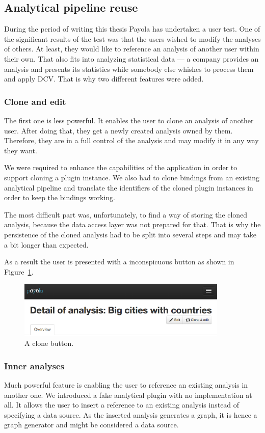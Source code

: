 \subsection{Analytical pipeline reuse}
During the period of writing this thesis Payola has undertaken a user test. One 
of the significant results of the test was that the users wished to modify the
analyses of others. At least, they would like to reference an analysis of 
another user within their own. That also fits into analyzing statistical data --- 
a company provides an analysis and presents its statistics while somebody else 
whishes to process them and apply DCV. That is why two different features 
were added.

\subsubsection{Clone and edit}
The first one is less powerful. It enables the user to clone an analysis of 
another user. After doing that, they get a newly created analysis owned by 
them. Therefore, they are in a full control of the analysis and may modify it in 
any way they want.

We were required to enhance the capabilities of the application in order to 
support cloning a plugin instance. We also had to clone bindings from an 
existing analytical pipeline and translate the identifiers of the cloned plugin 
instances in order to keep the bindings working.

The most difficult part was, unfortunately, to find a way of storing the cloned 
analysis, because the data access layer was not prepared for that. That is why
the persistence of the cloned analysis had to be split into several steps and may take a 
bit longer than expected.

As a result the user is presented with a inconspicuous button as shown in 
Figure~\ref{fig:clone-button}.

\begin{figure}
	\centering
	\includegraphics[width=100mm]{img/clone-button.png}
	\caption{A clone button.}
	\label{fig:clone-button}
\end{figure}

\subsubsection{Inner analyses}
Much powerful feature is enabling the user to reference an existing analysis in 
another one. We introduced a fake analytical plugin with no implementation at 
all. It allows the user to insert a reference to an existing analysis instead 
of specifying a data source. As the inserted analysis generates a graph, 
it is hence a graph generator and might be considered a data source.

